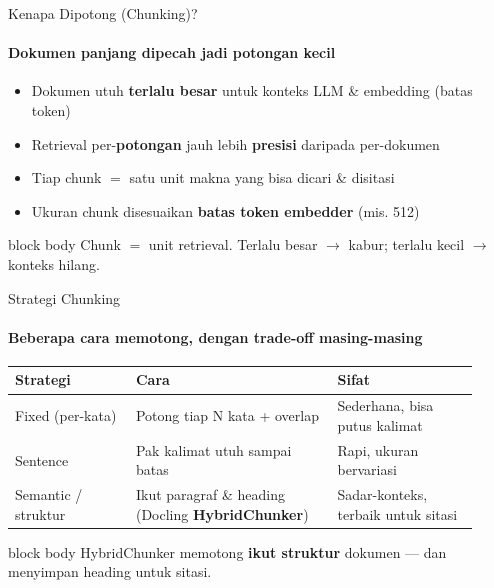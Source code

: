 \documentclass[aspectratio=169,t]{beamer}
\newcommand{\takeaway}[1]{%
  \vspace{0.3em}
  \begin{beamercolorbox}[rounded=true,shadow=false,sep=6pt]{block body}
    \centering\small\color{nvlightgreen}#1
  \end{beamercolorbox}%
}
\begin{document}
\begin{frame}{Kenapa Dipotong (Chunking)?}
  \framesubtitle{Dokumen panjang dipecah jadi potongan kecil}
  \begin{itemize}\footnotesize
    \item Dokumen utuh \textbf{terlalu besar} untuk konteks LLM \& embedding (batas token)
    \item Retrieval per-\textbf{potongan} jauh lebih \textbf{presisi} daripada per-dokumen
    \item Tiap chunk $=$ satu unit makna yang bisa dicari \& disitasi
    \item Ukuran chunk disesuaikan \textbf{batas token embedder} (mis. 512)
  \end{itemize}
  \vspace{0.3em}
  \begin{center}
  \end{center}
  \takeaway{Chunk $=$ unit retrieval. Terlalu besar $\to$ kabur; terlalu kecil $\to$ konteks hilang.}
\end{frame}

\begin{frame}{Strategi Chunking}
  \framesubtitle{Beberapa cara memotong, dengan trade-off masing-masing}
  \begin{center}
  \renewcommand{\arraystretch}{1.3}{\footnotesize\setlength{\tabcolsep}{5pt}
  \begin{tabular}{@{}p{0.24\linewidth}p{0.40\linewidth}p{0.28\linewidth}@{}}
    \toprule \rowcolor{nvcard!50}
    \textbf{Strategi} & \textbf{Cara} & \textbf{Sifat} \\ \midrule
    Fixed (per-kata) & Potong tiap N kata + overlap & Sederhana, bisa putus kalimat \\
    Sentence & Pak kalimat utuh sampai batas & Rapi, ukuran bervariasi \\
    Semantic / struktur & Ikut paragraf \& heading (Docling \textbf{HybridChunker}) & Sadar-konteks, terbaik untuk sitasi \\
    \bottomrule
  \end{tabular}}
  \end{center}
  \takeaway{HybridChunker memotong \textbf{ikut struktur} dokumen --- dan menyimpan heading untuk sitasi.}
\end{frame}
\end{document}
